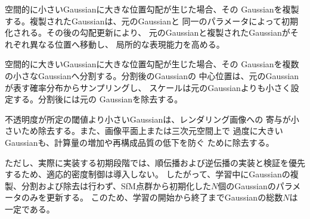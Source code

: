 \documentclass[dvipdfmx]{jlreq}
\begin{document}
空間的に小さいGaussianに大きな位置勾配が生じた場合、その
Gaussianを複製する。複製されたGaussianは、元のGaussianと
同一のパラメータによって初期化される。その後の勾配更新により、
元のGaussianと複製されたGaussianがそれぞれ異なる位置へ移動し、
局所的な表現能力を高める。

空間的に大きいGaussianに大きな位置勾配が生じた場合、その
Gaussianを複数の小さなGaussianへ分割する。分割後のGaussianの
中心位置は、元のGaussianが表す確率分布からサンプリングし、
スケールは元のGaussianよりも小さく設定する。分割後には元の
Gaussianを除去する。

不透明度が所定の閾値より小さいGaussianは、レンダリング画像への
寄与が小さいため除去する。また、画像平面上または三次元空間上で
過度に大きいGaussianも、計算量の増加や再構成品質の低下を防ぐ
ために除去する。

ただし、実際に実装する初期段階では、順伝播および逆伝播の実装と検証を優先するため、適応的密度制御は導入しない。
したがって、学習中にGaussianの複製、分割および除去は行わず、SfM点群から初期化した$N$個のGaussianのパラメータのみを更新する。
このため、学習の開始から終了までGaussianの総数$N$は一定である。


\clearpage
\onecolumn

\footnotesize
\setlength{\tabcolsep}{5pt}
\renewcommand{\arraystretch}{1.15}
\end{document}
